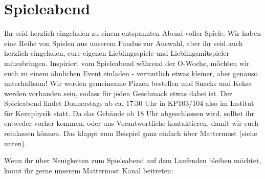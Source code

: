 \section{Spieleabend}
\begin{multicols}{2}

Ihr seid herzlich eingeladen zu einem entspannten Abend voller Spiele. 
Wir haben eine Reihe von Spielen aus unserem Fundus zur Auswahl, aber ihr seid auch herzlich eingeladen, eure eigenen Lieblingsspiele und Lieblingsmitspieler mitzubringen.
Inspiriert vom Spieleabend während der O-Woche, möchten wir euch zu einem ähnlichen Event einladen - vermutlich etwas kleiner, aber genauso unterhaltsam! 
Wir werden gemeinsame Pizzen bestellen und Snacks und Kekse werden vorhanden sein, sodass für jeden Geschmack etwas dabei ist.
Der Spieleabend findet Donnerstags ab ca. 17:30 Uhr in KP103/104 also im Institut für Kernphysik statt.
Da das Gebäude ab 18 Uhr abgeschlossen wird, solltet ihr entweder vorher kommen, oder uns Verantwortliche kontaktieren, damit wir euch reinlassen können. 
Das klappt zum Beispiel ganz einfach über Mattermost (siehe unten).


\begin{multicols}{2}
Wenn ihr über Neuigkeiten zum Spieleabend auf dem Laufenden bleiben möchtet, könnt ihr gerne unserem Mattermost Kanal beitreten:
\end{multicols}

\end{multicols}
